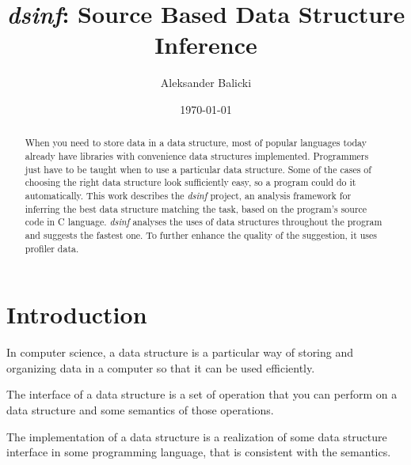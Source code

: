 \documentclass[a4paper,11pt]{article}
\title{\emph{dsinf}: Source Based Data Structure Inference}
\author{Aleksander Balicki}
\date{\today}
\begin{document}
\vfill

\maketitle

\begin{abstract}

    When you need to store data in a data structure, most of popular languages
    today already have libraries with convenience data structures implemented.
    Programmers just have to be taught when to use a particular data structure. Some of
    the cases of choosing the right data structure look sufficiently easy, so a
    program could do it automatically. This work describes the \emph{dsinf} project,
    an analysis framework for inferring the best data structure matching the task,
    based on the program's source code in C language. \emph{dsinf} analyses the 
    uses of data structures throughout the program and suggests the fastest one.     
    To further enhance the quality of the suggestion, it uses profiler data.

\end{abstract}

\pagebreak

\tableofcontents

\vfill

\section{Introduction} \label{sec:intro}
	In computer science, a data structure is a particular way of storing and organizing data in a computer so that
	it can be used efficiently\cite{Wids}.

	The interface of a data structure is a set of operation that you can perform on a data structure and some
	semantics of those operations.

	The implementation of a data structure is a realization of some data structure interface in some programming
	language, that is consistent with the semantics.
\end{document}
